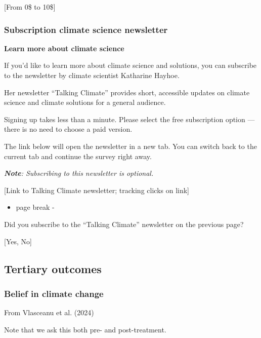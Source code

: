 \documentclass[
  letterpaper,
  DIV=11,
  numbers=noendperiod]{scrartcl}
\providecommand{\tightlist}{%
  \setlength{\itemsep}{0pt}\setlength{\parskip}{0pt}}
\begin{document}
{[}From 0\$ to 10\${]}

\subsubsection{Subscription climate science
newsletter}\label{subscription-climate-science-newsletter}

\textbf{Learn more about climate science}

If you'd like to learn more about climate science and solutions, you can
subscribe to the newsletter by climate scientist Katharine Hayhoe.

Her newsletter ``Talking Climate'' provides short, accessible updates on
climate science and climate solutions for a general audience.

Signing up takes less than a minute. Please select the free subscription
option --- there is no need to choose a paid version.

The link below will open the newsletter in a new tab. You can switch
back to the current tab and continue the survey right away.

\emph{\textbf{Note}: Subscribing to this newsletter is optional.}

{[}Link to Talking Climate newsletter; tracking clicks on link{]}

\begin{itemize}
\tightlist
\item
  page break -
\end{itemize}

Did you subscribe to the ``Talking Climate'' newsletter on the previous
page?

{[}Yes, No{]}

\subsection{Tertiary outcomes}\label{tertiary-outcomes}

\subsubsection{Belief in climate
change}\label{belief-in-climate-change-1}

\begin{tcolorbox}[enhanced jigsaw, toprule=.15mm, toptitle=1mm, colframe=quarto-callout-note-color-frame, leftrule=.75mm, rightrule=.15mm, bottomtitle=1mm, coltitle=black, colbacktitle=quarto-callout-note-color!10!white, bottomrule=.15mm, breakable, opacityback=0, titlerule=0mm, title=\textcolor{quarto-callout-note-color}{\faInfo}\hspace{0.5em}{Note}, left=2mm, arc=.35mm, opacitybacktitle=0.6, colback=white]

From Vlasceanu et al. (2024)

Note that we ask this both pre- and post-treatment.

\end{tcolorbox}
\end{document}
